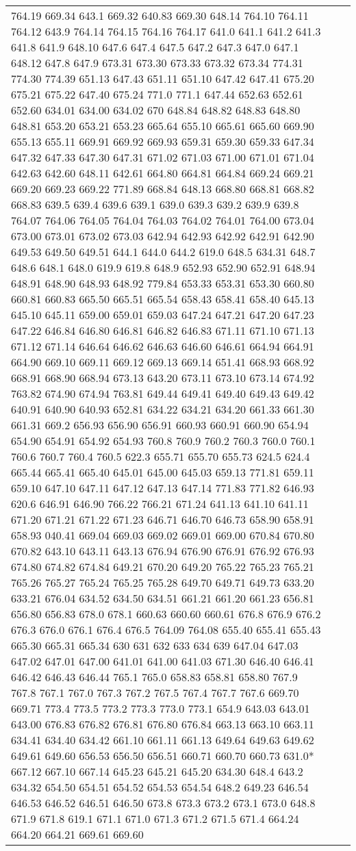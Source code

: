 \begin{longtable}{|L{.1in}|L{.6in}||L{5.65in}|}
764.19 669.34 643.1 669.32 640.83 669.30 648.14 764.10 764.11 764.12 643.9 764.14 764.15 764.16 764.17 641.0 641.1 641.2 641.3 641.8 641.9 648.10 647.6 647.4 647.5 647.2 647.3 647.0 647.1 648.12 647.8 647.9 673.31 673.30 673.33 673.32 673.34 774.31 774.30 774.39 651.13 647.43 651.11 651.10 647.42 647.41 675.20 675.21 675.22 647.40 675.24 771.0 771.1 647.44 652.63 652.61 652.60 634.01 634.00 634.02 670 648.84 648.82 648.83 648.80 648.81 653.20 653.21 653.23 665.64 655.10 665.61 665.60 669.90 655.13 655.11 669.91 669.92 669.93 659.31 659.30 659.33 647.34 647.32 647.33 647.30 647.31 671.02 671.03 671.00 671.01 671.04 642.63 642.60 648.11 642.61 664.80 664.81 664.84 669.24 669.21 669.20 669.23 669.22 771.89 668.84 648.13 668.80 668.81 668.82 668.83 639.5 639.4 639.6 639.1 639.0 639.3 639.2 639.9 639.8 764.07 764.06 764.05 764.04 764.03 764.02 764.01 764.00 673.04 673.00 673.01 673.02 673.03 642.94 642.93 642.92 642.91 642.90 649.53 649.50 649.51 644.1 644.0 644.2 619.0 648.5 634.31 648.7 648.6 648.1 648.0 619.9 619.8 648.9 652.93 652.90 652.91 648.94 648.91 648.90 648.93 648.92 779.84 653.33 653.31 653.30 660.80 660.81 660.83 665.50 665.51 665.54 658.43 658.41 658.40 645.13 645.10 645.11 659.00 659.01 659.03 647.24 647.21 647.20 647.23 647.22 646.84 646.80 646.81 646.82 646.83 671.11 671.10 671.13 671.12 671.14 646.64 646.62 646.63 646.60 646.61 664.94 664.91 664.90 669.10 669.11 669.12 669.13 669.14 651.41 668.93 668.92 668.91 668.90 668.94 673.13 643.20 673.11 673.10 673.14 674.92 763.82 674.90 674.94 763.81 649.44 649.41 649.40 649.43 649.42 640.91 640.90 640.93 652.81 634.22 634.21 634.20 661.33 661.30 661.31 669.2 656.93 656.90 656.91 660.93 660.91 660.90 654.94 654.90 654.91 654.92 654.93 760.8 760.9 760.2 760.3 760.0 760.1 760.6 760.7 760.4 760.5 622.3 655.71 655.70 655.73 624.5 624.4 665.44 665.41 665.40 645.01 645.00 645.03 659.13 771.81 659.11 659.10 647.10 647.11 647.12 647.13 647.14 771.83 771.82 646.93 620.6 646.91 646.90 766.22 766.21 671.24 641.13 641.10 641.11 671.20 671.21 671.22 671.23 646.71 646.70 646.73 658.90 658.91 658.93 040.41 669.04 669.03 669.02 669.01 669.00 670.84 670.80 670.82 643.10 643.11 643.13 676.94 676.90 676.91 676.92 676.93 674.80 674.82 674.84 649.21 670.20 649.20 765.22 765.23 765.21 765.26 765.27 765.24 765.25 765.28 649.70 649.71 649.73 633.20 633.21 676.04 634.52 634.50 634.51 661.21 661.20 661.23 656.81 656.80 656.83 678.0 678.1 660.63 660.60 660.61 676.8 676.9 676.2 676.3 676.0 676.1 676.4 676.5 764.09 764.08 655.40 655.41 655.43 665.30 665.31 665.34 630 631 632 633 634 639 647.04 647.03 647.02 647.01 647.00 641.01 641.00 641.03 671.30 646.40 646.41 646.42 646.43 646.44 765.1 765.0 658.83 658.81 658.80 767.9 767.8 767.1 767.0 767.3 767.2 767.5 767.4 767.7 767.6 669.70 669.71 773.4 773.5 773.2 773.3 773.0 773.1 654.9 643.03 643.01 643.00 676.83 676.82 676.81 676.80 676.84 663.13 663.10 663.11 634.41 634.40 634.42 661.10 661.11 661.13 649.64 649.63 649.62 649.61 649.60 656.53 656.50 656.51 660.71 660.70 660.73 631.0* 667.12 667.10 667.14 645.23 645.21 645.20 634.30 648.4 643.2 634.32 654.50 654.51 654.52 654.53 654.54 648.2 649.23 646.54 646.53 646.52 646.51 646.50 673.8 673.3 673.2 673.1 673.0 648.8 671.9 671.8 619.1 671.1 671.0 671.3 671.2 671.5 671.4 664.24 664.20 664.21 669.61 669.60 
\end{longtable}
